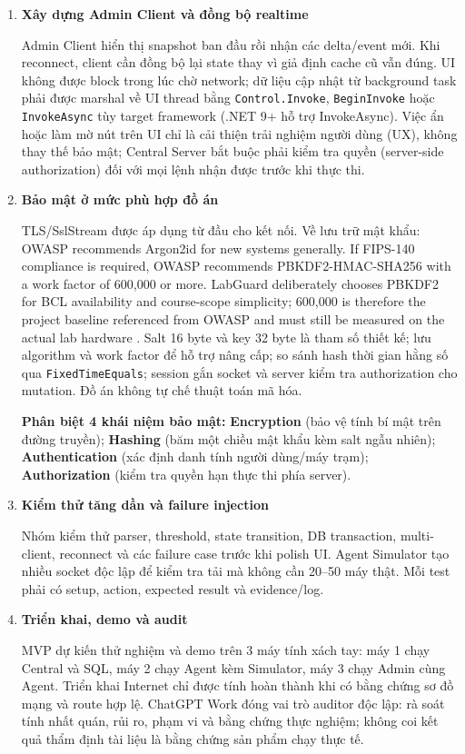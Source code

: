 \begin{enumerate}
    \item \textbf{Xây dựng Admin Client và đồng bộ realtime}

    Admin Client hiển thị snapshot ban đầu rồi nhận các delta/event mới. Khi reconnect, client cần đồng bộ lại state thay vì giả định cache cũ vẫn đúng. UI không được block trong lúc chờ network; dữ liệu cập nhật từ background task phải được marshal về UI thread bằng \texttt{Control.Invoke}, \texttt{BeginInvoke} hoặc \texttt{InvokeAsync} \cite{mslearn_winforms_threadsafe} tùy target framework (.NET 9+ hỗ trợ InvokeAsync). Việc ẩn hoặc làm mờ nút trên UI chỉ là cải thiện trải nghiệm người dùng (UX), không thay thế bảo mật; Central Server bắt buộc phải kiểm tra quyền (server-side authorization) đối với mọi lệnh nhận được trước khi thực thi.

    \item \textbf{Bảo mật ở mức phù hợp đồ án}

    TLS/SslStream \cite{rfc8446,mslearn_sslstream} được áp dụng từ đầu cho kết nối. Về lưu trữ mật khẩu: OWASP recommends Argon2id for new systems generally. If FIPS-140 compliance is required, OWASP recommends PBKDF2-HMAC-SHA256 with a work factor of 600,000 or more. LabGuard deliberately chooses PBKDF2 for BCL availability and course-scope simplicity; 600,000 is therefore the project baseline referenced from OWASP and must still be measured on the actual lab hardware \cite{owasp_password_storage}. Salt 16 byte và key 32 byte là tham số thiết kế; lưu algorithm và work factor để hỗ trợ nâng cấp; so sánh hash thời gian hằng số qua \texttt{FixedTimeEquals}; session gắn socket và server kiểm tra authorization cho mutation. Đồ án không tự chế thuật toán mã hóa.

    \begin{beginnerbox}
    \textbf{Phân biệt 4 khái niệm bảo mật:} \textbf{Encryption} (bảo vệ tính bí mật trên đường truyền); \textbf{Hashing} (băm một chiều mật khẩu kèm salt ngẫu nhiên); \textbf{Authentication} (xác định danh tính người dùng/máy trạm); \textbf{Authorization} (kiểm tra quyền hạn thực thi phía server).
    \end{beginnerbox}

    \item \textbf{Kiểm thử tăng dần và failure injection}

    Nhóm kiểm thử parser, threshold, state transition, DB transaction, multi-client, reconnect và các failure case trước khi polish UI. Agent Simulator tạo nhiều socket độc lập để kiểm tra tải mà không cần 20--50 máy thật. Mỗi test phải có setup, action, expected result và evidence/log.

    \item \textbf{Triển khai, demo và audit}

    MVP dự kiến thử nghiệm và demo trên 3 máy tính xách tay: máy 1 chạy Central và SQL, máy 2 chạy Agent kèm Simulator, máy 3 chạy Admin cùng Agent. Triển khai Internet chỉ được tính hoàn thành khi có bằng chứng sơ đồ mạng và route hợp lệ. ChatGPT Work đóng vai trò auditor độc lập: rà soát tính nhất quán, rủi ro, phạm vi và bằng chứng thực nghiệm; không coi kết quả thẩm định tài liệu là bằng chứng sản phẩm chạy thực tế.
\end{enumerate}
